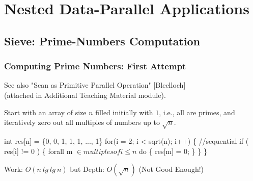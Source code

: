 \documentclass{beamer}
\renewcommand{\emph}[1]{\textcolor{structure}{#1}}
\newcommand{\emp}[1]{\textcolor{DikuRed}{ #1}}
\newcommand{\mymath}[1]{$ #1 $}
\begin{document}


\section{Nested Data-Parallel Applications} 

\begin{frame}[fragile]
	\tableofcontents[currentsection]
\end{frame}

\subsection{Sieve: Prime-Numbers Computation}

\begin{frame}[fragile,t]
  \frametitle{Computing Prime Numbers: First Attempt}

See also "Scan as Primitive Parallel Operation" [Bleelloch]\\
(attached in Additional Teaching Material module).

\medskip

Start with an array of size $n$ filled initially with $1$,
i.e., all are primes, and iteratively zero out all multiples
of numbers up to $\sqrt{n}$.
\bigskip

\begin{colorcode}
int res[n] = \{0, 0, 1, 1, 1, ..., 1\}
for(i = 2; i < sqrt(n); i++) \{  \alert{//sequential}
    if ( res[i] != 0 ) \{
        \emph{forall m \mymath{\in multiples of i \leq n} do} \{
             res[m] = 0;
        \}
    \}
\}
\end{colorcode}
\bigskip

\emph{Work: $O(n \ lg \ lg \ n)$} but \emp{Depth: $O(\sqrt{n})$ (Not Good Enough!)}

\end{frame}
\end{document}
